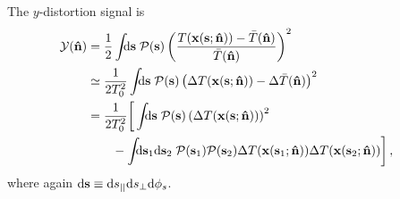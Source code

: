 \documentclass[fleqn,usenatbib]{mnras}
\begin{document}
    The $y$-distortion signal is
    \begin{align}
        \Yd(\nhat)
            &=  \frac{1}{2}
                \int\!\!\!\dif{\mbf{s}}\;
                    \mcal{P}(\mbf{s})
                    \left(\frac{T(\mbf{x}(\mbf{s};\nhat))-\bar{T}(\nhat)}{\bar{T}(\nhat)}\right)^2
            \\
            &\simeq
                \frac{1}{2T_0^2}
                \int\!\!\!\dif{\mbf{s}}\;
                    \mcal{P}(\mbf{s})
                    \left( \DeltaT(\mbf{x}(\mbf{s};\nhat))- \Delta \bar{T}(\nhat) \right)^2
            \\
            &=
                \frac{1}{2T_0^2}
                \bigg[
                    \int\!\!\!\dif{\mbf{s}}\; \mcal{P}(\mbf{s}) \left( \DeltaT(\mbf{x}(\mbf{s};\mbf{\nhat}))\right)^2 & \label{eq:signal_realspace}
                    \\ &\qquad
                    - \int\!\!\!\dif{\mbf{s}_1}\dif{\mbf{s}_2}\;
                        \mcal{P}(\mbf{s}_1) \mcal{P}(\mbf{s}_2)
                        \DeltaT(\mbf{x}(\mbf{s}_1;\mbf{\nhat}))
                        \DeltaT(\mbf{x}(\mbf{s}_2;\mbf{\nhat}))
                \bigg]\nonumber \,,
    \end{align}
    where again $\dif{\mbf{s}}\equiv \dif{\spll}\dif{\sprp} \dif{\phi_s}$.
\end{document}
